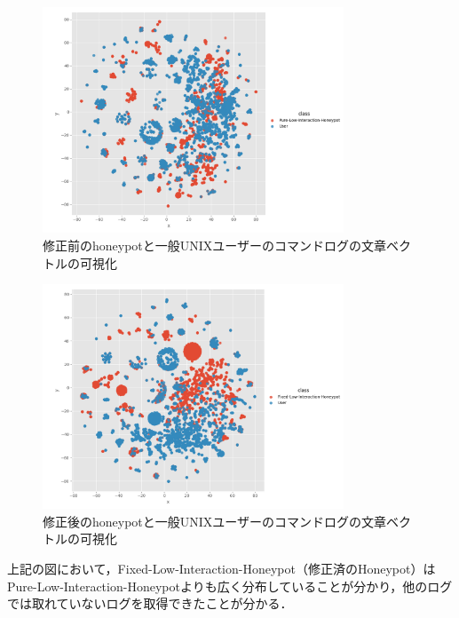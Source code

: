 \vspace{10mm}
\begin{figure}[htbp]
    \centering
    \includegraphics[width=0.8\textwidth]{figures/suuser.png}
    \caption{修正前のhoneypotと一般UNIXユーザーのコマンドログの文章ベクトルの可視化}
    \label{fig:tsne2}
\end{figure}
\vspace{10mm}

\vspace{10mm}
\begin{figure}[htbp]
    \centering
    \includegraphics[width=0.8\textwidth]{figures/fixuser.png}
    \caption{修正後のhoneypotと一般UNIXユーザーのコマンドログの文章ベクトルの可視化}
    \label{fig:tsne3}
\end{figure}
\vspace{10mm}
\clearpage

上記の図において，Fixed-Low-Interaction-Honeypot（修正済のHoneypot）はPure-Low-Interaction-Honeypotよりも広く分布していることが分かり，他のログでは取れていないログを取得できたことが分かる．


